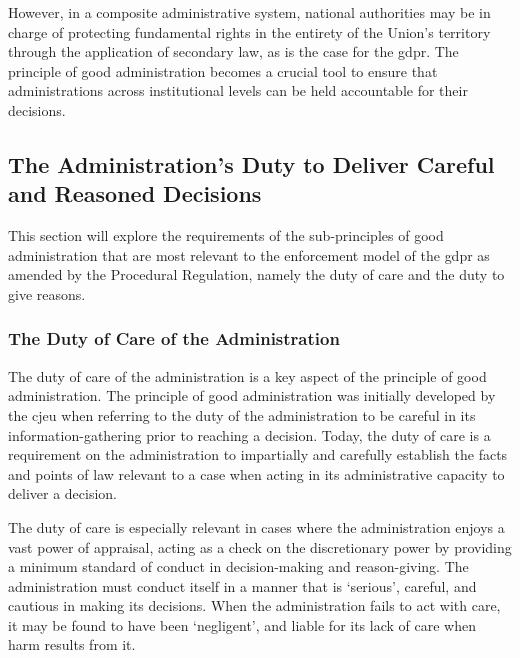 However, in a composite administrative system, national authorities may be in charge of protecting fundamental rights in the entirety of the Union's territory through the application of secondary law, as is the case for the \gls{gdpr}. The principle of good administration becomes a crucial tool to ensure that administrations across institutional levels can be held accountable for their decisions.

\subsection{The Administration's Duty to Deliver Careful and Reasoned Decisions}
\label{sec:ch2-duty-care-reasons}

This section will explore the requirements of the sub-principles of good administration that are most relevant to the enforcement model of the \gls{gdpr} as amended by the Procedural Regulation, namely the duty of care and the duty to give reasons.

\subsubsection{The Duty of Care of the Administration}
\label{sec:ch2-duty-of-care}
\label{sec:DoC}

The duty of care of the administration is a key aspect of the principle of good administration.
The principle of good administration was initially developed by the \gls{cjeu} when referring to the duty of the administration to be careful in its information-gathering prior to reaching a decision.\autocite[195]{hofmannAdministrativeLawPolicy2012}
Today, the duty of care is a requirement on the administration to impartially and carefully establish the facts and points of law relevant to a case when acting in its administrative capacity to deliver a decision.\autocites[point 15]{NolleAG}[195]{hofmannAdministrativeLawPolicy2012}

The duty of care is especially relevant in cases where the administration enjoys a vast power of appraisal,\autocite[14]{TUM} acting as a check on the discretionary power by providing a minimum standard of conduct in decision-making and reason-giving.\autocite[216]{hofmannDemkovaPrinciplesProcJustice}
The administration must conduct itself in a manner that is `serious',\autocite[59]{Metropole} careful, and cautious\autocite[93]{Masdar} in making its decisions.
When the administration fails to act with care, it may be found to have been `negligent', and liable for its lack of care when harm results from it.\autocite[90--91]{Masdar}

